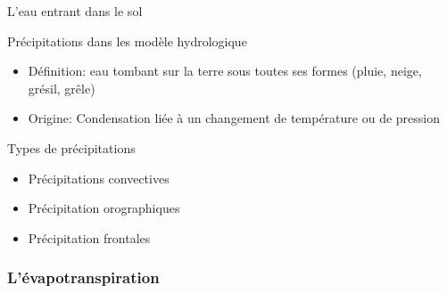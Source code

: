 \documentclass{beamer}
\numberwithin{equation}{section}
\begin{document}
	\begin{frame}{L'eau entrant dans le sol}
		\begin{block}{Précipitations dans les modèle hydrologique}
			\begin{itemize}
				\item Définition: eau tombant sur la terre sous toutes ses formes (pluie, neige, grésil, grêle)
				\item Origine: Condensation liée à un changement de température ou de pression 
			\end{itemize}
		\end{block}
		\begin{block}{Types de précipitations}
			\begin{itemize}
				\item Précipitations convectives
				\item Précipitation orographiques
				\item Précipitation frontales 
			\end{itemize}
		\end{block}
	\end{frame}

	\subsubsection{L'évapotranspiration}
	
\end{document}
